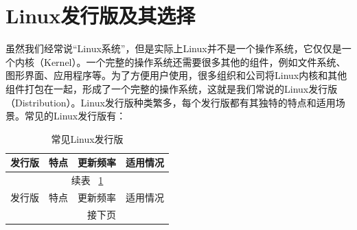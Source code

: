 \section{Linux发行版及其选择}

虽然我们经常说“Linux系统”，但是实际上Linux并不是一个操作系统，它仅仅是一个内核（Kernel）。一个完整的操作系统还需要很多其他的组件，例如文件系统、图形界面、应用程序等。为了方便用户使用，很多组织和公司将Linux内核和其他组件打包在一起，形成了一个完整的操作系统，这就是我们常说的Linux发行版（Distribution）。Linux发行版种类繁多，每个发行版都有其独特的特点和适用场景。常见的Linux发行版有：
\begin{small}
  \begin{longtable}[c]{l|lll}
    \caption{常见Linux发行版}\label{tab:linux-distros}\\
    \toprule
    发行版 & 特点 & 更新频率 & 适用情况 \\
    \midrule
    \endfirsthead          %

    \multicolumn{4}{c}{\footnotesize 续表~ \ref{tab:linux-distros} }\\[.5ex]
    \toprule
    发行版 & 特点 & 更新频率 & 适用情况 \\
    \midrule
    \endhead               %

    \midrule
    \multicolumn{3}{r}{\footnotesize 接下页}
    \endfoot               %

    \bottomrule
    \endlastfoot


\end{longtable}
\end{small}
